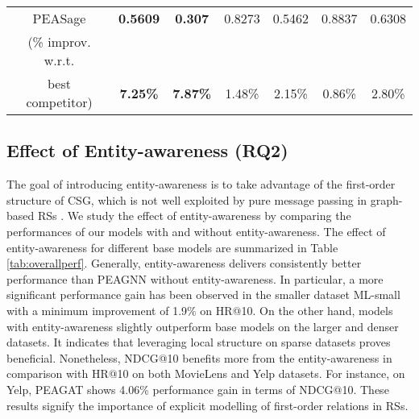 \documentclass[runningheads, envcountsame, a4paper]{llncs}
\begin{document}
\begin{table*}[t!]
\begin{threeparttable}
\begin{tabular}{|c|c c|c c|c c|}
    PEASage\tnote{*} & \textbf{0.5609} & \textbf{0.307} & 0.8273 & 0.5462 & 0.8837 & 0.6308\\
(\% improv. w.r.t. &&&&&&\\ best competitor) & \textbf{7.25\%} & \textbf{7.87\%} & 1.48\% & 2.15\% & 0.86\% & 2.80\%\\
  \hline
 \hline
\end{tabular}
\caption{Overall Performance Comparison. The scores are average of five runs. Bold indicates best results for the dataset. * denotes entity-awareness.}
\label{tab:overallperf}
\end{threeparttable}
\vspace{-5mm}
\end{table*}

\subsection{Effect of Entity-awareness (RQ2)}
The goal of introducing entity-awareness is to take advantage of the first-order structure of CSG, which is not well exploited by pure message passing in graph-based RSs \cite{gilmer2017neural}. 
We study the effect of entity-awareness by comparing the performances of our models with and without entity-awareness. 
The effect of entity-awareness for different base models are summarized in Table \ref{tab:overallperf}.
Generally, entity-awareness delivers consistently better performance than PEAGNN without entity-awareness. 
In particular, a more significant performance gain has been observed in the smaller dataset ML-small with a minimum improvement of 1.9\% on HR@10.
On the other hand, models with entity-awareness slightly outperform base models on the larger and denser datasets. 
It indicates that leveraging local structure on sparse datasets proves beneficial. 
Nonetheless, NDCG@10 benefits more from the entity-awareness in  comparison with HR@10 on both MovieLens and Yelp datasets. For instance, on Yelp, PEAGAT shows 4.06\% performance gain in terms of NDCG@10. 
These results signify the importance of explicit modelling of first-order relations in RSs.
\end{document}
